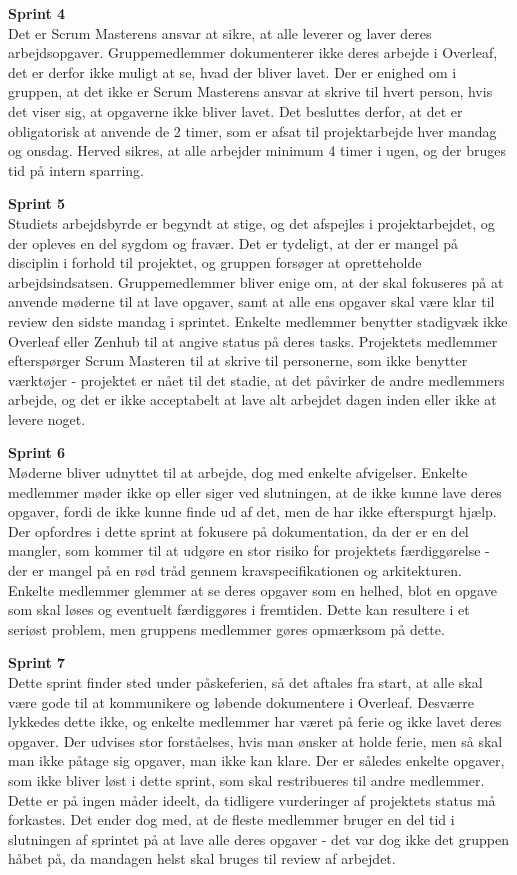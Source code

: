 \documentclass[a4paper,12pt,fleqn,oneside]{article}
\begin{document}
\textbf{Sprint 4}\\
Det er Scrum Masterens ansvar at sikre, at alle leverer og laver deres arbejdsopgaver. Gruppemedlemmer dokumenterer ikke deres arbejde i Overleaf, det er derfor ikke muligt at se, hvad der bliver lavet. Der er enighed om i gruppen, at det ikke er Scrum Masterens ansvar at skrive til hvert person, hvis det viser sig, at opgaverne ikke bliver lavet. Det besluttes derfor, at det er obligatorisk at anvende de 2 timer, som er afsat til projektarbejde hver mandag og onsdag. Herved sikres, at alle arbejder minimum 4 timer i ugen, og der bruges tid på intern sparring. 

\textbf{Sprint 5}\\
Studiets arbejdsbyrde er begyndt at stige, og det afspejles i projektarbejdet, og der opleves en del sygdom og fravær. Det er tydeligt, at der er mangel på disciplin i forhold til projektet, og gruppen forsøger at opretteholde arbejdsindsatsen. Gruppemedlemmer bliver enige om, at der skal fokuseres på at anvende møderne til at lave opgaver, samt at alle ens opgaver skal være klar til review den sidste mandag i sprintet. Enkelte medlemmer benytter stadigvæk ikke Overleaf eller Zenhub til at angive status på deres tasks. Projektets medlemmer efterspørger Scrum Masteren til at skrive til personerne, som ikke benytter værktøjer - projektet er nået til det stadie, at det påvirker de andre medlemmers arbejde, og det er ikke acceptabelt at lave alt arbejdet dagen inden eller ikke at levere noget. 

\textbf{Sprint 6}\\
Møderne bliver udnyttet til at arbejde, dog med enkelte afvigelser. Enkelte medlemmer møder ikke op eller siger ved slutningen, at de ikke kunne lave deres opgaver, fordi de ikke kunne finde ud af det, men de har ikke efterspurgt hjælp. Der opfordres i dette sprint at fokusere på dokumentation, da der er en del mangler, som kommer til at udgøre en stor risiko for projektets færdiggørelse - der er mangel på en rød tråd gennem kravspecifikationen og arkitekturen. Enkelte medlemmer glemmer at se deres opgaver som en helhed, blot en opgave som skal løses og eventuelt færdiggøres i fremtiden. Dette kan resultere i et seriøst problem, men gruppens medlemmer gøres opmærksom på dette. 

\textbf{Sprint 7}\\
Dette sprint finder sted under påskeferien, så det aftales fra start, at alle skal være gode til at kommunikere og løbende dokumentere i Overleaf. Desværre lykkedes dette ikke, og enkelte medlemmer har været på ferie og ikke lavet deres opgaver. Der udvises stor forståelses, hvis man ønsker at holde ferie, men så skal man ikke påtage sig opgaver, man ikke kan klare. Der er således enkelte opgaver, som ikke bliver løst i dette sprint, som skal restribueres til andre medlemmer. Dette er på ingen måder ideelt, da tidligere vurderinger af projektets status må forkastes. Det ender dog med, at de fleste medlemmer bruger en del tid i slutningen af sprintet på at lave alle deres opgaver - det var dog ikke det gruppen håbet på, da mandagen helst skal bruges til review af arbejdet. 
\end{document}
